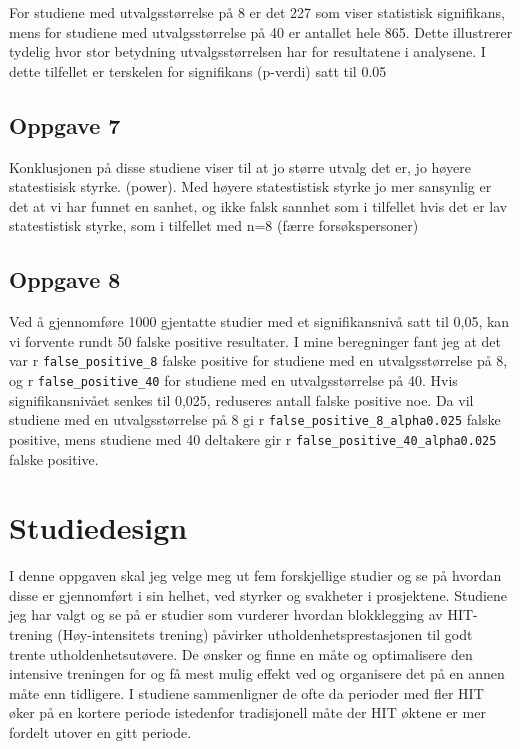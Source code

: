 \documentclass[
  letterpaper,
  DIV=11,
  numbers=noendperiod]{scrreprt}
\begin{document}
For studiene med utvalgsstørrelse på 8 er det 227 som viser statistisk
signifikans, mens for studiene med utvalgsstørrelse på 40 er antallet
hele 865. Dette illustrerer tydelig hvor stor betydning
utvalgsstørrelsen har for resultatene i analysene. I dette tilfellet er
terskelen for signifikans (p-verdi) satt til 0.05

\section{Oppgave 7}\label{oppgave-7}

Konklusjonen på disse studiene viser til at jo større utvalg det er, jo
høyere statestisisk styrke. (power). Med høyere statestistisk styrke jo
mer sansynlig er det at vi har funnet en sanhet, og ikke falsk sannhet
som i tilfellet hvis det er lav statestistisk styrke, som i tilfellet
med n=8 (færre forsøkspersoner)

\section{Oppgave 8}\label{oppgave-8}

Ved å gjennomføre 1000 gjentatte studier med et signifikansnivå satt til
0,05, kan vi forvente rundt 50 falske positive resultater. I mine
beregninger fant jeg at det var r \texttt{false\_positive\_8} falske
positive for studiene med en utvalgsstørrelse på 8, og r
\texttt{false\_positive\_40} for studiene med en utvalgsstørrelse på 40.
Hvis signifikansnivået senkes til 0,025, reduseres antall falske
positive noe. Da vil studiene med en utvalgsstørrelse på 8 gi r
\texttt{false\_positive\_8\_alpha0.025} falske positive, mens studiene
med 40 deltakere gir r \texttt{false\_positive\_40\_alpha0.025} falske
positive.


\chapter{Studiedesign}\label{studiedesign}

I denne oppgaven skal jeg velge meg ut fem forskjellige studier og se på
hvordan disse er gjennomført i sin helhet, ved styrker og svakheter i
prosjektene. Studiene jeg har valgt og se på er studier som vurderer
hvordan blokklegging av HIT-trening (Høy-intensitets trening) påvirker
utholdenhetsprestasjonen til godt trente utholdenhetsutøvere. De ønsker
og finne en måte og optimalisere den intensive treningen for og få mest
mulig effekt ved og organisere det på en annen måte enn tidligere. I
studiene sammenligner de ofte da perioder med fler HIT øker på en
kortere periode istedenfor tradisjonell måte der HIT øktene er mer
fordelt utover en gitt periode.
\end{document}

